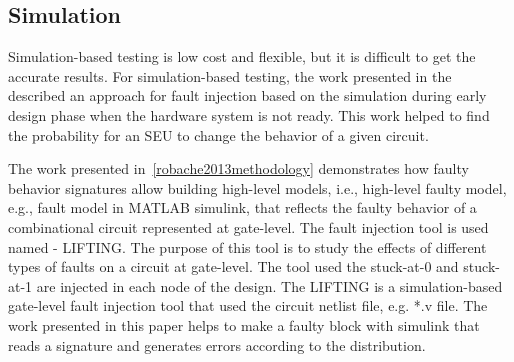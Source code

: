 %
%        
%        
%




\subsection{Simulation}

Simulation-based testing is low cost and flexible, but it is difficult to get the accurate results. For simulation-based testing, the work presented in the~\cite{violante2004simulation} described an approach for fault injection based on the simulation during early design phase when the hardware system is not ready.  This work helped to find the probability for an SEU to change the behavior of a given circuit.

The work presented in~\ref{robache2013methodology} demonstrates how faulty behavior signatures allow building high-level models, i.e., high-level faulty model, e.g., fault model in MATLAB simulink, that reflects the faulty behavior of a combinational circuit represented at gate-level. The fault injection tool is used named - LIFTING.  The purpose of this tool is to study the effects of different types of faults on a circuit at gate-level. The tool used the stuck-at-0 and stuck-at-1 are injected in each node of the design. The LIFTING is a simulation-based gate-level fault injection tool that used the circuit netlist file, e.g.  *.v file. The work presented in this paper helps to make a faulty block with simulink that reads a signature and generates errors according to the distribution.

